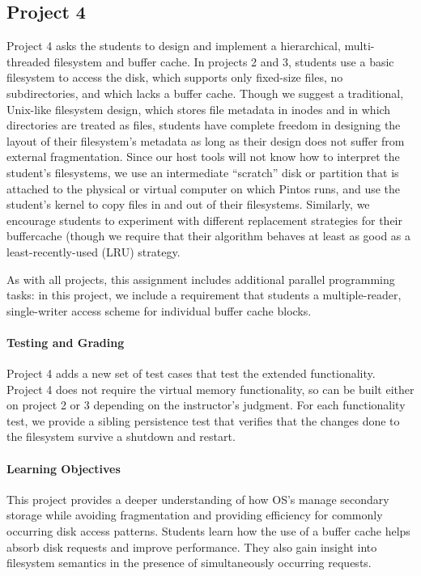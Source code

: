 \subsection{Project 4}
Project 4 asks the students to design and implement a hierarchical, multi-threaded
filesystem and buffer cache.  In projects 2 and 3, students use a basic filesystem
to access the disk, which supports only fixed-size files, no subdirectories,
and which lacks a buffer cache.  
Though we suggest a traditional, Unix-like filesystem design, which stores file
metadata in inodes and in which directories are treated as files, students have
complete freedom in designing the layout of their filesystem's metadata as long
as their design does not suffer from external fragmentation.
Since our host tools will not know how to interpret the student's filesystems,
we use an intermediate ``scratch'' disk or partition that is attached to the 
physical or virtual computer on which Pintos runs, and use the student's kernel
to copy files in and out of their filesystems.
Similarly, we encourage students to experiment with different replacement
strategies for their buffercache (though we require that their algorithm
behaves at least as good as a least-recently-used (LRU) strategy.

As with all projects, this assignment includes additional parallel programming 
tasks: in this project, we include a requirement that students a multiple-reader, 
single-writer access scheme for individual buffer cache blocks.

\paragraph{Testing and Grading}
Project 4 adds a new set of test cases that test the extended functionality.
Project 4 does not require the virtual memory functionality, so can be built
either on project 2 or 3 depending on the instructor's judgment.
For each functionality test, we provide a sibling persistence test that verifies 
that the changes done to the filesystem survive a shutdown and restart.

\paragraph{Learning Objectives}
This project provides a deeper understanding of how OS's manage secondary storage
while avoiding fragmentation and providing efficiency for commonly occurring 
disk access patterns.  
Students learn how the use of a buffer cache helps absorb disk requests and
improve performance.
They also gain insight into filesystem semantics in the presence of simultaneously
occurring requests.


